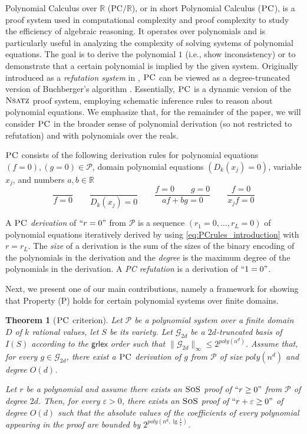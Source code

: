 \documentclass[11pt]{article}
\newcommand{\sos}{\text{\sc{SoS}}}
\newcommand{\PC}{\textsc{PC}}
\newcommand{\Nsatz}{\textsc{Nsatz}}
\newcommand{\grlexns}{\textsf{grlex}}
\newcommand{\1}{\textbf{1}}
\newcommand{\GB}{\text{Gr\"{o}bner} }
\newtheorem{theorem}{Theorem}[section]
\begin{document}
Polynomial Calculus over $\mathbb{R}$ ($\textrm{PC}\slash \mathbb{R}$), or in short Polynomial Calculus ($\PC$), is a proof system used in computational complexity and proof complexity to study the efficiency of algebraic reasoning. It operates over polynomials and is particularly useful in analyzing the complexity of solving systems of polynomial equations. The goal is to derive the polynomial \(1\) (i.e., show inconsistency) or to demonstrate that a certain polynomial is implied by the given system. 
Originally introduced as a \textit{refutation system} in \cite{CleggEI96}, $\PC$ can be viewed as a degree-truncated version of Buchberger’s algorithm \cite{JeffersonJGD13, Cox}. Essentially, $\PC$ is a dynamic version of the $\Nsatz$ proof system, employing schematic inference rules to reason about polynomial equations. We emphasize that, for the remainder of the paper, we will consider \(\PC\) in the broader sense of polynomial derivation (so not restricted to refutation) and with polynomials over the reals.

$\PC$ consists of the following derivation rules for polynomial equations $(f = 0), (g = 0) \in  \mathcal{P}$, domain polynomial equations $(D_{k}(x_j)=0)$, variable $x_j$, and numbers $a, b \in \mathbb{R}$
\begin{equation}\label{eq:PCrules_introduction}
    \frac{}{f=0} \qquad \frac{}{D_{k}(x_j)=0} \qquad \frac{f=0 \qquad g=0}{a f + b g =0} \qquad \frac{f=0}{x_jf=0} 
\end{equation}


A \emph{$\PC$ derivation} of $``r=0"$ from $\mathcal{P}$ is a sequence $(r_1=0,\ldots,r_L=0)$ of polynomial equations iteratively derived by using \eqref{eq:PCrules_introduction} with $r=r_L$. The \emph{size} of a derivation is the sum of the sizes of the binary encoding of the polynomials in the derivation and the \emph{degree} is the maximum degree of the polynomials in the derivation. A \emph{PC refutation} is a derivation of $``1=0"$.

Next, we present one of our main contributions, namely a framework for showing that Property (\textsc{P}) holds for certain polynomial systems over finite domains.

\begin{theorem}[$\PC$ criterion]\label{th:PC_criterion_introduction}
    Let $\mathcal{P}$ be a polynomial system over a finite domain $D$ of $k$ rational values, let $S$ be its variety. Let $\mathcal{G}_{2d}$ be a $2d$-truncated \GB basis of $I(S)$ according to the $\grlexns$ order such that $\|\mathcal{G}_{2d}\|_{\infty}\leq 2^{poly(n^d)}$. Assume that, for every $g\in \mathcal{G}_{2d}$, there exist a $\PC$ derivation of $g$ from $\mathcal{P}$ of size $poly(n^d)$ and degree $O(d)$. 
    
    Let $r$ be a polynomial and assume there exists an $\sos$ proof of $``r \geq 0"$ from $\mathcal{P}$ of degree $2d$. Then, for every $\varepsilon>0$, there exists an $\sos$ proof of $``r + \varepsilon \geq 0"$ of degree $O(d)$
    such that the absolute values of the coefficients of every polynomial appearing in the proof are bounded by $2^{poly(n^d, \lg \frac{1}{\varepsilon})}$.
\end{theorem}
\end{document}
